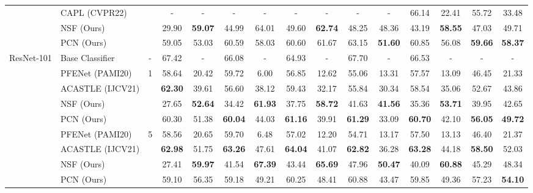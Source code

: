 \documentclass[journal]{IEEEtran}
\begin{document}
\begin{table*}[ht]
\begin{adjustbox}{max width=\textwidth}
\begin{tabular}{l|l|c|cccccccc|cccc}
         & CAPL (CVPR22) & & - & - & - & - & - & - & - & - & 66.14 & 22.41 & 55.72 & 33.48 \\
         & NSF (Ours) & & 29.90 & \textbf{59.07} & 44.99 & 64.01 & 49.60 & \textbf{62.74} & 48.25 & 48.36 & 43.19 & \textbf{58.55} & 47.03 & 49.71 \\
         & PCN (Ours) & & 59.05 & 53.03 & 60.59 & 58.03 & 60.60 & 61.67 & 63.15 & \textbf{51.60} & 60.85 & 56.08 & \textbf{59.66} & \textbf{58.37} \\
         \hline
         \multirow{9}{*}{ResNet-101} & Base Classifier & - & 67.42 & - & 66.08 & - & 64.93 & - & 67.70 & - & 66.53 & - & - & - \\
         \cline{3-15}
         & PFENet (PAMI20) & \multirow{4}{*}{1} & 58.64 & 20.42 & 59.72 & 6.00 & 56.85 & 12.62 & 55.06 & 13.31 & 57.57 & 13.09 & 46.45 & 21.33 \\
         & ACASTLE (IJCV21) & & \textbf{62.30} & 39.61 & 56.60 & 38.12 & 59.43 & 32.17 & 55.84 & 30.34 & 58.54 & 35.06 & 52.67 & 43.86 \\
         & NSF (Ours) & & 27.65 & \textbf{52.64} & 34.42 & \textbf{61.93} & 37.75 & \textbf{58.72} & 41.63 & \textbf{41.56} & 35.36 & \textbf{53.71} & 39.95 & 42.65 \\
         & PCN (Ours) & & 60.30 & 51.38 & \textbf{60.04} & 44.03 & \textbf{61.16} & 39.91 & \textbf{61.29} & 33.09 & \textbf{60.70} & 42.10 & \textbf{56.05} & \textbf{49.72} \\
         \cline{2-15}
         & PFENet (PAMI20) & \multirow{4}{*}{5} & 58.56 & 20.65 & 59.70 & 6.48 & 57.02 & 12.20 & 54.71 & 13.17 & 57.50 & 13.13 & 46.40 & 21.37 \\
         & ACASTLE (IJCV21) & & \textbf{62.98} & 51.75 & \textbf{63.26} & 47.61 & \textbf{64.04} & 41.07 & \textbf{62.82} & 36.28 & \textbf{63.28} & 44.18 & \textbf{58.50} & 52.03 \\
         & NSF (Ours) & & 27.41 & \textbf{59.97} & 41.54 & \textbf{67.39} & 43.44 & \textbf{65.69} & 47.96 & \textbf{50.47} & 40.09 & \textbf{60.88} & 45.29 & 48.34 \\
         & PCN (Ours) & & 59.10 & 56.35 & 59.18 & 49.21 & 60.25 & 48.41 & 60.88 & 43.47 & 59.85 & 49.36 & 57.23 & \textbf{54.10} \\
         \hline
    \end{tabular}
    \end{adjustbox}
    \label{tab:pascal_main}
\end{table*}
\end{document}
